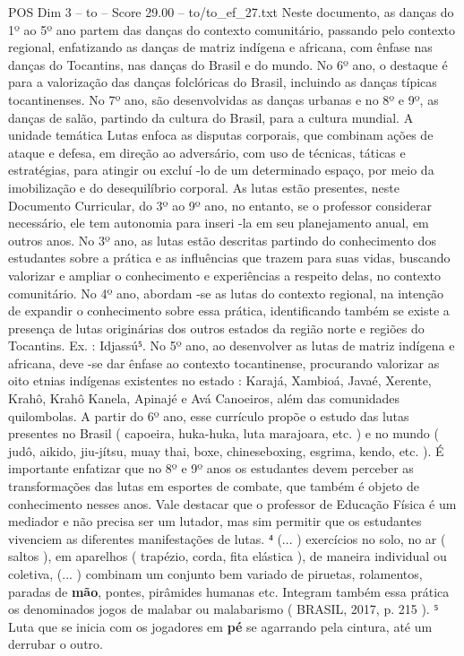 \begin{textsample}{POS Dim 3 – to – Score 29.00 – to/to\_ef\_27.txt}
Neste documento, as danças do 1º ao 5º ano partem das danças do contexto comunitário, passando pelo contexto regional, enfatizando as danças de matriz indígena e africana, com ênfase nas danças do Tocantins, nas danças do Brasil e do mundo.
No 6º ano, o destaque é para a valorização das danças folclóricas do Brasil, incluindo as danças típicas tocantinenses.
No 7º ano, são desenvolvidas as danças urbanas e no 8º e 9º, as danças de salão, partindo da cultura do Brasil, para a cultura mundial.
A unidade temática Lutas enfoca as disputas corporais, que combinam ações de ataque e defesa, em direção ao adversário, com uso de técnicas, táticas e estratégias, para atingir ou excluí -lo de um determinado espaço, por meio da imobilização e do desequilíbrio corporal.
As lutas estão presentes, neste Documento Curricular, do 3º ao 9º ano, no entanto, se o professor considerar necessário, ele tem autonomia para inseri -la em seu planejamento anual, em outros anos.
No 3º ano, as lutas estão descritas partindo do conhecimento dos estudantes sobre a prática e as influências que trazem para suas vidas, buscando valorizar e ampliar o conhecimento e experiências a respeito delas, no contexto comunitário.
No 4º ano, abordam -se as lutas do contexto regional, na intenção de expandir o conhecimento sobre essa prática, identificando também se existe a presença de lutas originárias dos outros estados da região norte e regiões do Tocantins.
Ex. : Idjassú⁵.
No 5º ano, ao desenvolver as lutas de matriz indígena e africana, deve -se dar ênfase ao contexto tocantinense, procurando valorizar as oito etnias indígenas existentes no estado : Karajá, Xambioá, Javaé, Xerente, Krahô, Krahô Kanela, Apinajé e Avá Canoeiros, além das comunidades quilombolas.
A partir do 6º ano, esse currículo propõe o estudo das lutas presentes no Brasil ( capoeira, huka-huka, luta marajoara, etc. ) e no mundo ( judô, aikido, jiu-jítsu, muay thai, boxe, chineseboxing, esgrima, kendo, etc. ).
É importante enfatizar que no 8º e 9º anos os estudantes devem perceber as transformações das lutas em esportes de combate, que também é objeto de conhecimento nesses anos.
Vale destacar que o professor de Educação Física é um mediador e não precisa ser um lutador, mas sim permitir que os estudantes vivenciem as diferentes manifestações de lutas. ⁴ (... ) exercícios no solo, no ar ( saltos ), em aparelhos ( trapézio, corda, fita elástica ), de maneira individual ou coletiva, (... ) combinam um conjunto bem variado de piruetas, rolamentos, paradas de \textbf{mão}, pontes, pirâmides humanas etc.
Integram também essa prática os denominados jogos de malabar ou malabarismo ( BRASIL, 2017, p. 215 ). ⁵ Luta que se inicia com os jogadores em \textbf{pé} se agarrando pela cintura, até um derrubar o outro.

\end{textsample}
